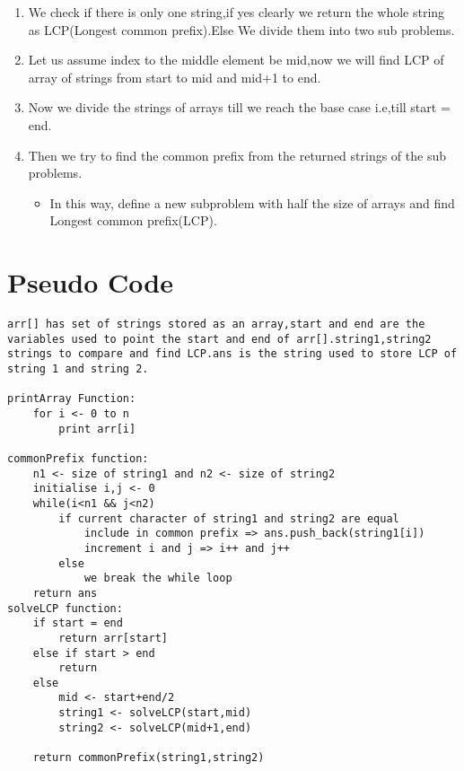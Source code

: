 \documentclass{article}
\begin{document}
\begin{multicols}{2}
\begin{enumerate}
\item We check if there is only one string,if yes clearly we return the whole string as LCP(Longest common prefix).Else We divide them into two sub problems.
\item Let us assume index to the middle element be mid,now we will find LCP of array of strings from start to mid and mid+1 to end.
\item Now we divide the strings of arrays till we reach the base case i.e,till start = end.
\item Then we try to find the common prefix from the returned strings of the sub problems.
\begin{itemize}
\item In this way, define a new subproblem with half the size of arrays and find Longest common prefix(LCP).
\end{itemize}
\end{enumerate}


\section{Pseudo Code}

\begin{lstlisting}
arr[] has set of strings stored as an array,start and end are the variables used to point the start and end of arr[].string1,string2 strings to compare and find LCP.ans is the string used to store LCP of string 1 and string 2.

printArray Function:
    for i <- 0 to n
        print arr[i]

commonPrefix function:
    n1 <- size of string1 and n2 <- size of string2
    initialise i,j <- 0
    while(i<n1 && j<n2)
        if current character of string1 and string2 are equal
            include in common prefix => ans.push_back(string1[i])
            increment i and j => i++ and j++
        else 
            we break the while loop
    return ans
solveLCP function:
    if start = end 
        return arr[start]
    else if start > end
        return
    else 
        mid <- start+end/2
        string1 <- solveLCP(start,mid)
        string2 <- solveLCP(mid+1,end)
        
    return commonPrefix(string1,string2)
        
\end{lstlisting}

\end{multicols}
\end{document}
